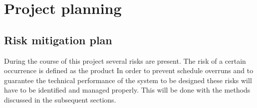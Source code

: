 \section{Project planning}\label{cha:plan}

\subsection{Risk mitigation plan}
\label{sec:riskmit}
During the course of this project several risks are present. The risk of a certain occurrence is defined as the product  In order to prevent schedule overruns and to guarantee the technical performance of the system to be designed these risks will have to be identified and managed properly. This will be done with the methods discussed in the subsequent sections.

